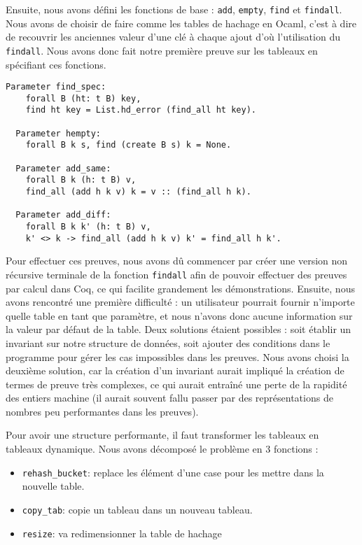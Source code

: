\documentclass{article}
\begin{document}
  Ensuite, nous avons défini les fonctions de base : \texttt{add}, \texttt{empty},
\texttt{find} et \texttt{findall}. Nous avons de choisir de faire comme les
tables de hachage en Ocaml, c'est à dire de recouvrir les anciennes valeur d'une
clé à chaque ajout d'où l'utilisation du \texttt{findall}. Nous avons donc fait
notre première preuve sur les tableaux en spécifiant ces fonctions.

\begin{lstlisting}[language=Coq]
  Parameter find_spec:
    forall B (ht: t B) key,
    find ht key = List.hd_error (find_all ht key).

  Parameter hempty:
    forall B k s, find (create B s) k = None.

  Parameter add_same:
    forall B k (h: t B) v,
    find_all (add h k v) k = v :: (find_all h k).

  Parameter add_diff:
    forall B k k' (h: t B) v,
    k' <> k -> find_all (add h k v) k' = find_all h k'.
\end{lstlisting}

  Pour effectuer ces preuves, nous avons dû commencer par créer une version non
récursive terminale de la fonction \texttt{findall} afin de pouvoir effectuer
des preuves par calcul dans Coq, ce qui facilite grandement les démonstrations.
Ensuite, nous avons rencontré une première difficulté : un utilisateur pourrait
fournir n'importe quelle table en tant que paramètre, et nous n'avons donc
aucune information sur la valeur par défaut de la table. Deux solutions étaient
possibles : soit établir un invariant sur notre structure de données, soit
ajouter des conditions dans le programme pour gérer les cas impossibles dans
les preuves. Nous avons choisi la deuxième solution, car la création d'un
invariant aurait impliqué la création de termes de preuve très complexes, ce
qui aurait entraîné une perte de la rapidité des entiers machine (il aurait
souvent fallu passer par des représentations de nombres peu performantes
dans les preuves).

  Pour avoir une structure performante, il faut transformer les tableaux en
tableaux dynamique. Nous avons décomposé le problème en 3 fonctions :

\begin{itemize}
  \item \texttt{rehash\_bucket}: replace les élément d'une case pour les mettre
    dans la nouvelle table.
  \item \texttt{copy\_tab}: copie un tableau dans un nouveau tableau.
  \item \texttt{resize}: va redimensionner la table de hachage
\end{itemize}
\end{document}
